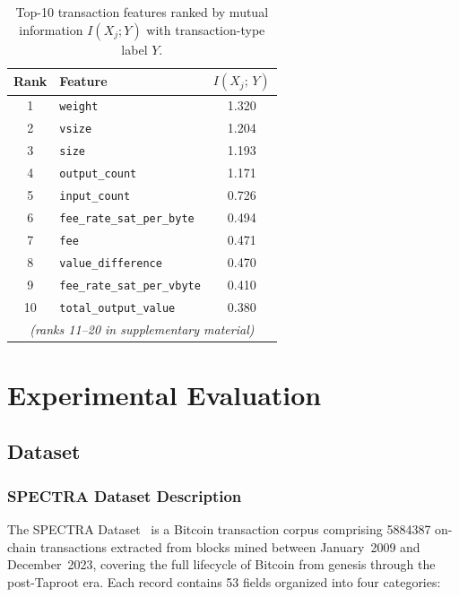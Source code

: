 \documentclass[journal]{IEEEtran}
\begin{document}
\begin{table}[t]
  \caption{Top-10 transaction features ranked by mutual information
           $I(X_j; Y)$ with transaction-type label $Y$.}
  \label{tab:mi_top20}
  \centering
  \renewcommand{\arraystretch}{1.12}
  \begin{tabular}{@{}clc@{}}
    \toprule
    \textbf{Rank} & \textbf{Feature} & $I(X_j;\,Y)$ \\
    \midrule
    1  & \texttt{weight}                    & 1.320 \\
    2  & \texttt{vsize}                     & 1.204 \\
    3  & \texttt{size}                      & 1.193 \\
    4  & \texttt{output\_count}             & 1.171 \\
    5  & \texttt{input\_count}              & 0.726 \\
    6  & \texttt{fee\_rate\_sat\_per\_byte} & 0.494 \\
    7  & \texttt{fee}                       & 0.471 \\
    8  & \texttt{value\_difference}         & 0.470 \\
    9  & \texttt{fee\_rate\_sat\_per\_vbyte}& 0.410 \\
    10 & \texttt{total\_output\_value}      & 0.380 \\
    \multicolumn{3}{c}{\textit{(ranks 11--20 in supplementary material)}} \\
    \bottomrule
  \end{tabular}
\end{table}

\FloatBarrier
\section{Experimental Evaluation}
\label{sec:experiments}

\subsection{Dataset}
\label{subsec:dataset}

\subsubsection{SPECTRA Dataset Description}
The SPECTRA Dataset~\cite{Korde2026Dataset} is a Bitcoin transaction corpus
comprising \num{5884387} on-chain transactions extracted from blocks mined between
January~2009 and December~2023, covering the full lifecycle of Bitcoin from
genesis through the post-Taproot era.  Each record contains \num{53} fields
organized into four categories:
\end{document}
